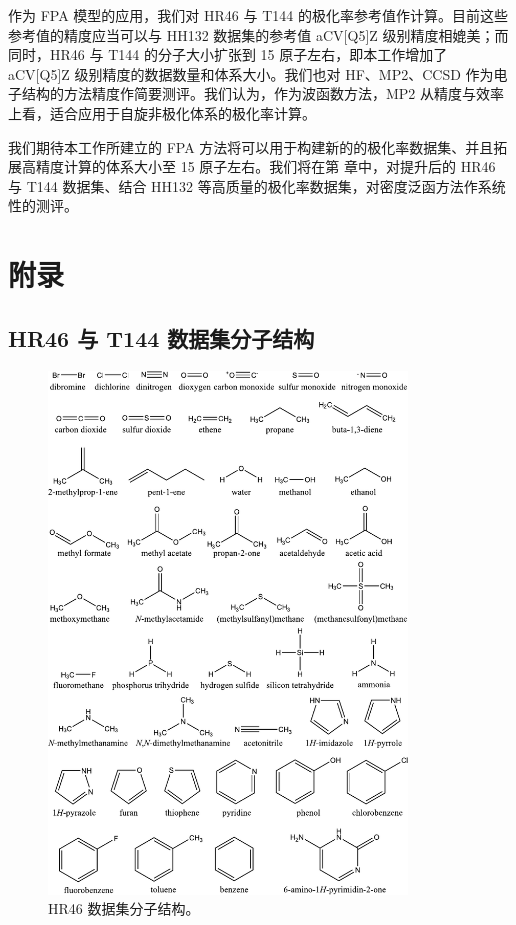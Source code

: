 作为 FPA 模型的应用，我们对 HR46 与 T144 的极化率参考值作计算。目前这些参考值的精度应当可以与 HH132 数据集的参考值 aCV[Q5]Z 级别精度相媲美；而同时，HR46 与 T144 的分子大小扩张到 15 原子左右，即本工作增加了 aCV[Q5]Z 级别精度的数据数量和体系大小。我们也对 HF、MP2、CCSD 作为电子结构的方法精度作简要测评。我们认为，作为波函数方法，MP2 从精度与效率上看，适合应用于自旋非极化体系的极化率计算。

我们期待本工作所建立的 FPA 方法将可以用于构建新的的极化率数据集、并且拓展高精度计算的体系大小至 15 原子左右。我们将在第  章中，对提升后的 HR46 与 T144 数据集、结合 HH132 等高质量的极化率数据集，对密度泛函方法作系统性的测评。

\section{附录}

\subsection{HR46 与 T144 数据集分子结构}

\begin{figure}[H]
    \centering
    \includegraphics[width=0.85\textwidth]{assets/fig-s1.pdf}
    \caption[HR46 数据集分子结构]{HR46 数据集分子结构。}
    \label{fig.fig-s1}
\end{figure}

